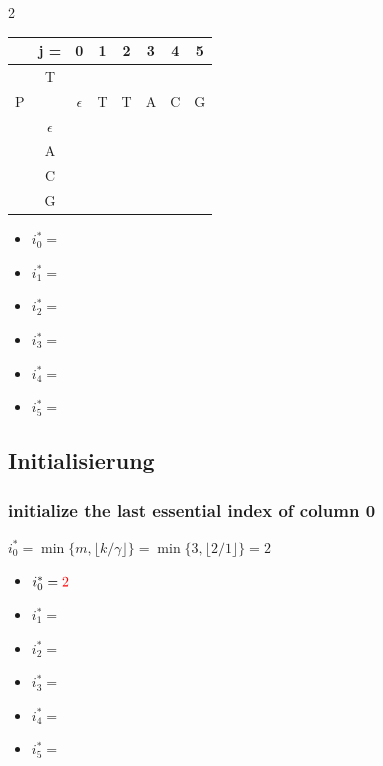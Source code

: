 \begin{multicols}{2}
    \begin{center}
        \begin{tabular}{|c c|c|c|c|c|c|c|} \hline
        &   j =  &  0           &   1   &   2   &   3   &   4   &   5   \\ \hline
        &   T    &              &       &       &       &       &       \\
        P   &        &  $\epsilon$  &   T   &   T   &   A   &   C   &   G   \\ \hline
        & $\epsilon$ &              &       &       &       &       &       \\ \hline
        &    A   &              &       &       &       &       &       \\ \hline
        &    C   &              &       &       &       &       &       \\ \hline
        &    G   &              &       &       &       &       &       \\ \hline
        \end{tabular}
    \end{center}
    \columnbreak
    \begin{itemize}
        \item $i_0^\ast = $
        \item $i_1^\ast = $
        \item $i_2^\ast = $
        \item $i_3^\ast = $
        \item $i_4^\ast = $
        \item $i_5^\ast = $
    \end{itemize}
\end{multicols}

\subsection*{Initialisierung}
\subsubsection*{initialize the last essential index of column 0}
$i_0^\ast = \min\{m,\lfloor k/\gamma\rfloor\} = \min\{3,\lfloor 2/ 1 \rfloor\} = 2$
\begin{itemize}
    \item $i_0^\ast = \textcolor{red}{2}$
    \item $i_1^\ast = $
    \item $i_2^\ast = $
    \item $i_3^\ast = $
    \item $i_4^\ast = $
    \item $i_5^\ast = $
\end{itemize}

